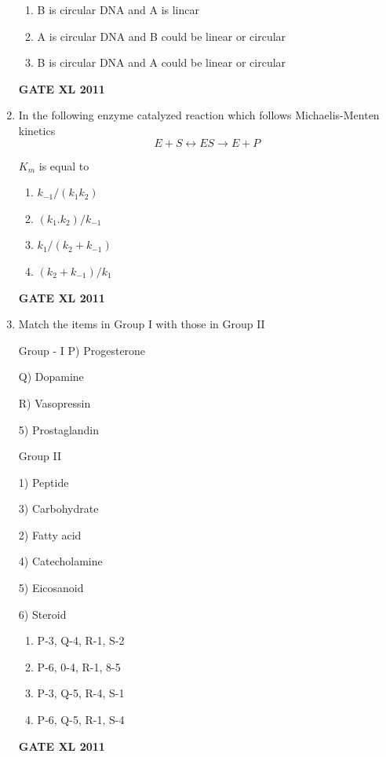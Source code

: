 \documentclass[journal,12pt,onecolumn]{IEEEtran}
\begin{document}
\begin{enumerate}
\begin{enumerate}
		\item{ B is circular DNA and A is lincar}

		\item{ A is circular DNA and B could be linear or circular}

		\item{ B is circular DNA and A could be linear or circular}
	\end{enumerate}
	\hfill{\textbf{GATE XL 2011}}
\item {In the following enzyme catalyzed reaction which follows Michaelis-Menten kinetics	
	\textbf{ \[E + S \leftrightarrow ES \rightarrow E + P\]}
	
	$K_m$ is equal to}
		\begin{enumerate}
			\item $k_{-1}/(k_1k_2)$
			\item $(k_1. k_2)/k_{-1}$
			\item $ k_1/(k_2+k_{-1})$
			\item $(k_2+k_{-1})/k_1$
		\end{enumerate}
		\hfill{\textbf{GATE XL 2011}}

\item {Match the items in Group I with those in Group II}
	\newline
\begin{minipage}{0.5\textwidth}
\begin{flushleft}
	Group - I
P) Progesterone

Q) Dopamine

R) Vasopressin

5) Prostaglandin

		\end{flushleft}
		\end{minipage}
	\begin{minipage}{0.5\textwidth}
		\begin{flushleft}
Group II

1) Peptide

3) Carbohydrate

2) Fatty acid

4) Catecholamine

5) Eicosanoid

6) Steroid
		\end{flushleft}
		\end{minipage}


		\begin{enumerate}
			\item P-3, Q-4, R-1, S-2
			\item P-6, 0-4, R-1, 8-5
			\item P-3, Q-5, R-4, S-1
			\item P-6, Q-5, R-1, S-4
		\end{enumerate}
		\hfill{\textbf{GATE XL 2011}}


\end{enumerate}
\end{document}
